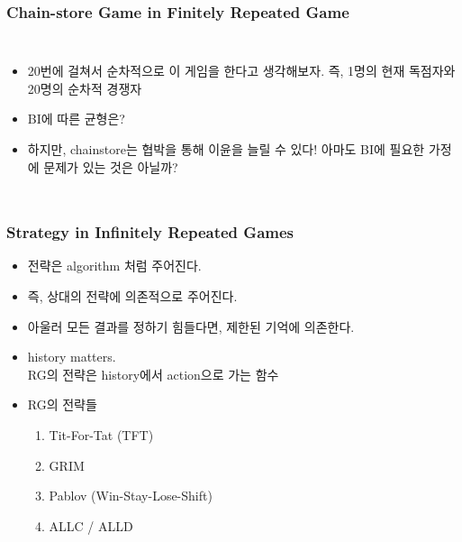 \documentclass[final]{beamer}
\begin{document}
\begin{frame}\frametitle{Chain-store Game in Finitely Repeated Game}\vspace{2em}
\begin{columns}[c]
\column{16em}
\begin{itemize}
	\item 20번에 걸쳐서 순차적으로 이 게임을 한다고 생각해보자. 즉, 1명의 현재 독점자와 20명의 순차적 경쟁자
	\item BI에 따른 균형은? 
	\item 하지만, chainstore는 협박을 통해 이윤을 늘릴 수 있다! 아마도 BI에 필요한 가정에 문제가 있는 것은 아닐까? 
\end{itemize}
\column{14em}\hspace{0em}
\end{columns}
\end{frame}

\begin{frame}\frametitle{Strategy in Infinitely Repeated Games}\vspace{1em}
\begin{itemize}
	\item 전략은 algorithm 처럼 주어진다. 
	\item 즉, 상대의 전략에 의존적으로 주어진다. 
	\item 아울러 모든 결과를 정하기 힘들다면, 제한된 기억에 의존한다. 
	\item history matters. \\RG의 전략은 history에서 action으로 가는 함수
	\item RG의 전략들 
	\begin{enumerate}
		\item Tit-For-Tat (TFT)
		\item GRIM 
		\item Pablov (Win-Stay-Lose-Shift)
		\item ALLC / ALLD 
	\end{enumerate}
\end{itemize}
\end{frame}
\end{document}

